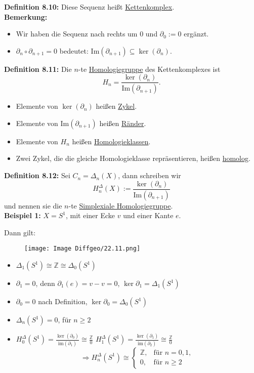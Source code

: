 \documentclass[fleqn, 12pt, letterpaper]{article}
\newcommand{\txt}[1]{\text{#1}}
\begin{document}
\textbf{Definition 8.10:}
Diese Sequenz heißt \underline{Kettenkomplex}.\\

\textbf{Bemerkung:}
\begin{itemize}
  \item Wir haben die Sequenz nach rechts um $0$ und $\partial_0 := 0$ ergänzt.
  \item $\partial_n \circ \partial_{n+1} = 0$ bedeutet: $\mathrm{Im}(\partial_{n+1}) \subseteq \ker(\partial_n)$.
\end{itemize}

\textbf{Definition 8.11:} Die $n$-te \underline{Homologiegruppe} des Kettenkomplexes ist
\[
H_n = \frac{\ker(\partial_n)}{\mathrm{Im}(\partial_{n+1})}.
\]
\begin{itemize}
  \item Elemente von $\ker(\partial_n)$ heißen \underline{Zykel}.
  \item Elemente von $\mathrm{Im}(\partial_{n+1})$ heißen \underline{Ränder}.
  \item Elemente von $H_n$ heißen \underline{Homologieklassen}.
  \item Zwei Zykel, die die gleiche Homologieklasse repräsentieren, heißen \underline{homolog}.
\end{itemize}

\textbf{Definition 8.12:}
Sei $C_n = \Delta_n(X)$, dann schreiben wir
\[
H_n^{\Delta}(X) := \frac{\ker(\partial_n)}{\mathrm{Im}(\partial_{n+1})}
\]
und nennen sie die $n$-te \underline{Simplexiale Homologiegruppe}.\\

\textbf{Beispiel 1:} $X = S^1$, mit einer Ecke $v$ und einer Kante $e$.

Dann gilt: 
  \begin{figure}[H]
    \centering
    \texttt{[image: Image Diffgeo/22.11.png]}
 \end{figure}

\begin{itemize}
  \item \(
\Delta_1(S^1) \cong \mathbb{Z} \cong\Delta_0(S^1)
\) 
  \item $\partial_1 = 0$, denn $\partial_1(e) = v - v = 0$,  $\ker \partial_1 =\Delta_1(S^1)$
  \item $\partial_0 =0$ nach Definition, $\ker \partial_0 = \Delta_0(S^1)$
  \item $\Delta_n(S^1) = 0$, für $n \ge 2$
  \item
  \(
   H_0^{\Delta}(S^1)=\frac{\ker(\partial_0)}{\txt{im}(\partial_1)}\cong\frac{\mathbb{Z}    }{0}
  \) \quad
    \(
   H_1^{\Delta}(S^1)=\frac{\ker(\partial_1)}{\txt{im}(\partial_2)}\cong\frac{\mathbb{Z}    }{0}
  \)
  \[
 \Rightarrow H_n^{\Delta}(S^1) \cong 
  \begin{cases}
    \mathbb{Z}, & \text{für } n = 0,1, \\
    0, & \text{für } n \ge 2
  \end{cases}
  \]
\end{itemize}
\end{document}
